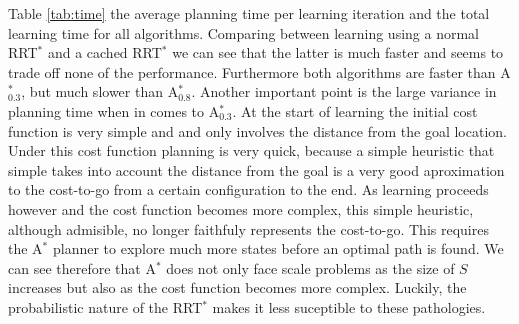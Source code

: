 \documentclass{article}  %
\begin{document}
	Table \ref{tab:time} the average planning time per learning iteration and the total learning time for all algorithms. Comparing between learning using a normal RRT$^*$ and a cached RRT$^*$ we can see that the latter is much faster and seems to trade off none of the performance. Furthermore both algorithms are faster than A$_{0.3}^*$, but much slower than A$_{0.8}^*$. Another important point is the large variance in planning time when in comes to A$_{0.3}^*$. At the start of learning the initial cost function is very simple and and only involves the distance from the goal location. Under this cost function planning is very quick, because a simple heuristic that simple takes into account the distance from the goal is a very good aproximation to the cost-to-go from a certain configuration to the end. As learning proceeds however and the cost function becomes more complex, this simple heuristic, although admisible, no longer faithfuly represents the cost-to-go. This requires the A$^*$ planner to explore much more states before an optimal path is found. We can see therefore that A$^*$ does not only face scale problems as the size of $S$ increases but also as the cost function becomes more complex. Luckily, the probabilistic nature of the RRT$^*$ makes it less suceptible to these pathologies.  
\end{document}
